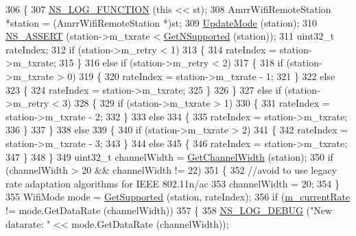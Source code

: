 \begin{DoxyCode}
306 \{
307   \hyperlink{log-macros-disabled_8h_a90b90d5bad1f39cb1b64923ea94c0761}{NS\_LOG\_FUNCTION} (\textcolor{keyword}{this} << st);
308   AmrrWifiRemoteStation *station = (AmrrWifiRemoteStation *)st;
309   \hyperlink{classns3_1_1AmrrWifiManager_a2bdf0c3696234b2d530d3becd174afdd}{UpdateMode} (station);
310   \hyperlink{assert_8h_a6dccdb0de9b252f60088ce281c49d052}{NS\_ASSERT} (station->m\_txrate < \hyperlink{classns3_1_1WifiRemoteStationManager_a7316bf091ebad5b8cd1a8b5ee47554d8}{GetNSupported} (station));
311   uint32\_t rateIndex;
312   \textcolor{keywordflow}{if} (station->m\_retry < 1)
313     \{
314       rateIndex = station->m\_txrate;
315     \}
316   \textcolor{keywordflow}{else} \textcolor{keywordflow}{if} (station->m\_retry < 2)
317     \{
318       \textcolor{keywordflow}{if} (station->m\_txrate > 0)
319         \{
320           rateIndex = station->m\_txrate - 1;
321         \}
322       \textcolor{keywordflow}{else}
323         \{
324           rateIndex = station->m\_txrate;
325         \}
326     \}
327   \textcolor{keywordflow}{else} \textcolor{keywordflow}{if} (station->m\_retry < 3)
328     \{
329       \textcolor{keywordflow}{if} (station->m\_txrate > 1)
330         \{
331           rateIndex = station->m\_txrate - 2;
332         \}
333       \textcolor{keywordflow}{else}
334         \{
335           rateIndex = station->m\_txrate;
336         \}
337     \}
338   \textcolor{keywordflow}{else}
339     \{
340       \textcolor{keywordflow}{if} (station->m\_txrate > 2)
341         \{
342           rateIndex = station->m\_txrate - 3;
343         \}
344       \textcolor{keywordflow}{else}
345         \{
346           rateIndex = station->m\_txrate;
347         \}
348     \}
349   uint32\_t channelWidth = \hyperlink{classns3_1_1WifiRemoteStationManager_a918213c5b9fa629c4986f6d90521bbd4}{GetChannelWidth} (station);
350   \textcolor{keywordflow}{if} (channelWidth > 20 && channelWidth != 22)
351     \{
352       \textcolor{comment}{//avoid to use legacy rate adaptation algorithms for IEEE 802.11n/ac}
353       channelWidth = 20;
354     \}
355   WifiMode mode = \hyperlink{classns3_1_1WifiRemoteStationManager_a995c8bae0d84b168fd3e8bc9ecaacdd4}{GetSupported} (station, rateIndex);
356   \textcolor{keywordflow}{if} (\hyperlink{classns3_1_1AmrrWifiManager_a382d0bbc09b6dfb2f9e20a0aa1fbf9c1}{m\_currentRate} != mode.GetDataRate (channelWidth))
357     \{
358       \hyperlink{group__logging_ga413f1886406d49f59a6a0a89b77b4d0a}{NS\_LOG\_DEBUG} (\textcolor{stringliteral}{"New datarate: "} << mode.GetDataRate (channelWidth));

\end{DoxyCode}
